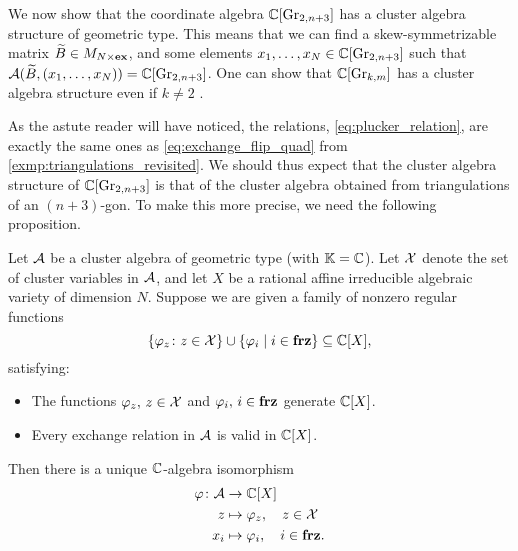 \medskip

We now show that the coordinate algebra $\mathbb{C}[\operatorname{Gr}_{2,n+3}]$ has a cluster algebra
structure of geometric type. This means that we can find a skew-symmetrizable matrix
$\widetilde{B} \in M_{N \times \mathbf{ex}}$, and some elements $x_1, \dots, x_N \in \mathbb{C}[\operatorname{Gr}_{2, n+3}]$
such that $\mathcal{A}(\widetilde{B}, (x_1, \dots, x_N)) = \mathbb{C}[\operatorname{Gr}_{2, n+3}]$. One can show that
$\mathbb{C}[\operatorname{Gr}_{k,m}]$ has a cluster algebra structure even if $k \neq 2$
\parencite{Scott2006GrassmanniansCA}.

As the astute reader will have noticed, the relations, \cref{eq:plucker_relation}, are
exactly the same ones as \cref{eq:exchange_flip_quad} from
\cref{exmp:triangulations_revisited}. We should thus expect that the cluster algebra
structure of $\mathbb{C}[\operatorname{Gr}_{2,n+3}]$ is that of the cluster algebra obtained from
triangulations of an $(n+3)$-gon. To make this more precise, we need the following
proposition.
\begin{proposition}\label{prop:cluster_structure}

	Let $\mathcal{A}$ be a cluster algebra of geometric type (with $\mathbb{K} = \mathbb{C}$). Let $\mathcal{X}$
	denote the set of cluster variables in $\mathcal{A}$, and let $X$ be a rational affine
	irreducible algebraic variety of dimension $N$. Suppose we are given a family of
	nonzero regular functions
	\begin{equation*}
		\{\varphi_z \colon z \in \mathcal{X} \} \cup \{\varphi_i \mid i \in \mathbf{frz}\} \subseteq \mathbb{C}[X],
	\end{equation*}
	satisfying:
	\begin{itemize}
		\item The functions $\varphi_z,\, z\in \mathcal{X}$ and $\varphi_i,\, i \in \mathbf{frz}$ generate
		      $\mathbb{C}[X]$.
		\item Every exchange relation in $\mathcal{A}$ is valid in $\mathbb{C}[X]$.
	\end{itemize}
	Then there is a unique $\mathbb{C}$-algebra isomorphism
	\begin{align*}
		\varphi \colon \mathcal{A} & \to \mathbb{C}[X]                         \\
		z                   & \mapsto \varphi_z,\quad z \in \mathcal{X}  \\
		x_i                 & \mapsto \varphi_i,\quad i \in \mathbf{frz}.
	\end{align*}
\end{proposition}

